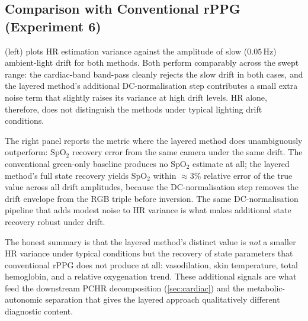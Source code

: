 \documentclass[10pt,twocolumn,a4paper]{article}
\theoremstyle{definition}
\begin{document}
\subsection{Comparison with Conventional rPPG (Experiment 6)}

 (left) plots HR estimation variance
against the amplitude of slow ($0.05\,\mathrm{Hz}$) ambient-light
drift for both methods. Both perform comparably across the swept
range: the cardiac-band band-pass cleanly rejects the slow drift in
both cases, and the layered method's additional DC-normalisation
step contributes a small extra noise term that slightly raises its
variance at high drift levels. HR alone, therefore, does not
distinguish the methods under typical lighting drift conditions.

The right panel reports the metric where the layered method does
unambiguously outperform: SpO$_{2}$ recovery error from the same
camera under the same drift. The conventional green-only baseline
produces no SpO$_{2}$ estimate at all; the layered method's full
state recovery yields SpO$_{2}$ within $\approx 3\%$ relative error
of the true value across all drift amplitudes, because the
DC-normalisation step removes the drift envelope from the RGB triple
before inversion. The same DC-normalisation pipeline that adds
modest noise to HR variance is what makes additional state recovery
robust under drift.

The honest summary is that the layered method's distinct value is
\emph{not} a smaller HR variance under typical conditions but the
recovery of state parameters that conventional rPPG does not produce
at all: vasodilation, skin temperature, total hemoglobin, and a
relative oxygenation trend. These additional signals are what feed
the downstream PCHR decomposition (\cref{sec:cardiac}) and the
metabolic-autonomic separation that gives the layered approach
qualitatively different diagnostic content.
\end{document}

